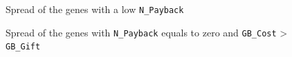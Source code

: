 \documentclass[12pt,a4paper]{article}
\begin{document}
\begin{figure}[htp] 
    \centering
    \hfill%
    \caption{Spread of the genes with a low \texttt{N\_Payback}}
\end{figure}

\begin{figure}[htp] 
    \centering
    \hfill%
    \caption{Spread of the genes with \texttt{N\_Payback} equals to zero and \texttt{GB\_Cost} > \texttt{GB\_Gift}}
\end{figure}
\end{document}
